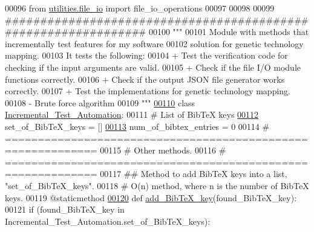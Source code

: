 \begin{DoxyCode}
00096 \textcolor{keyword}{from} \hyperlink{namespaceutilities_1_1file__io}{utilities.file\_io} \textcolor{keyword}{import} file\_io\_operations
00097 
00098 
00099 \textcolor{comment}{###############################################################}
00100 \textcolor{stringliteral}{"""}
00101 \textcolor{stringliteral}{    Module with methods that incrementally test features for my software}
00102 \textcolor{stringliteral}{        solution for genetic technology mapping.}
00103 \textcolor{stringliteral}{    It tests the following:}
00104 \textcolor{stringliteral}{    + Test the verification code for checking if the input arguments are valid.}
00105 \textcolor{stringliteral}{    + Check if the file I/O module functions correctly.}
00106 \textcolor{stringliteral}{    + Check if the output JSON file generator works correctly.}
00107 \textcolor{stringliteral}{    + Test the implementations for genetic technology mapping.}
00108 \textcolor{stringliteral}{        - Brute force algorithm}
00109 \textcolor{stringliteral}{"""}
\hypertarget{incremental__test_8py_source_l00110}{}\hyperlink{classincremental__test_1_1Incremental__Test__Automation}{00110} \textcolor{keyword}{class }\hyperlink{classincremental__test_1_1Incremental__Test__Automation}{Incremental\_Test\_Automation}:
00111     \textcolor{comment}{# List of BibTeX keys}
\hypertarget{incremental__test_8py_source_l00112}{}\hyperlink{classincremental__test_1_1Incremental__Test__Automation_a8f5272e0488026aa24a829262392f2f7}{00112}     set\_of\_BibTeX\_keys = []
\hypertarget{incremental__test_8py_source_l00113}{}\hyperlink{classincremental__test_1_1Incremental__Test__Automation_ac60587acca9d28d055bd8a7198a987a1}{00113}     num\_of\_bibtex\_entries = 0
00114     \textcolor{comment}{# ============================================================}
00115     \textcolor{comment}{#   Other methods.}
00116     \textcolor{comment}{# ============================================================}
00117     \textcolor{comment}{##  Method to add BibTeX keys into a list, "set\_of\_BibTeX\_keys".}
00118     \textcolor{comment}{#   O(n) method, where n is the number of BibTeX keys.}
00119     @staticmethod
\hypertarget{incremental__test_8py_source_l00120}{}\hyperlink{classincremental__test_1_1Incremental__Test__Automation_a14b316790ae1ef50d84bd4741a4fa020}{00120}     \textcolor{keyword}{def }\hyperlink{classincremental__test_1_1Incremental__Test__Automation_a14b316790ae1ef50d84bd4741a4fa020}{add\_BibTeX\_key}(found\_BibTeX\_key):
00121         \textcolor{keywordflow}{if} (found\_BibTeX\_key \textcolor{keywordflow}{in} Incremental\_Test\_Automation.set\_of\_BibTeX\_keys):

\end{DoxyCode}
